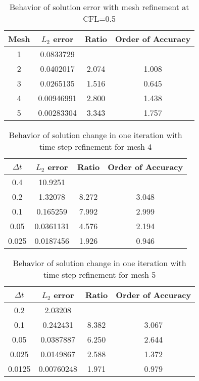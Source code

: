 \documentclass{article}
\begin{document}
\begin{table}[H]
\centering
\caption{Behavior of solution error with mesh refinement at CFL=0.5}
\label{table_order_2}
\vspace{10pt}
\begin{tabular}{cccc}
\hline
Mesh & $L_2$ error & Ratio & Order of Accuracy\\
\hline\hline
1 & 0.0833729  &       &       \\
2 & 0.0402017  & 2.074 & 1.008 \\
3 & 0.0265135  & 1.516 & 0.645 \\
4 & 0.00946991 & 2.800 & 1.438 \\
5 & 0.00283304 & 3.343 & 1.757 \\
\hline
\end{tabular}
\end{table}

\begin{table}[H]
\centering
\caption{Behavior of solution change in one iteration with time step refinement for mesh 4}
\label{table_order_3}
\vspace{10pt}
\begin{tabular}{cccc}
\hline
$\Delta t$ & $L_2$ error & Ratio & Order of Accuracy\\
\hline\hline
0.4   & 10.9251   &       &       \\
0.2   & 1.32078   & 8.272 & 3.048 \\
0.1   & 0.165259  & 7.992 & 2.999 \\
0.05  & 0.0361131 & 4.576 & 2.194 \\
0.025 & 0.0187456 & 1.926 & 0.946 \\
\hline
\end{tabular}
\end{table}

\begin{table}[H]
\centering
\caption{Behavior of solution change in one iteration with time step refinement for mesh 5}
\label{table_order_4}
\vspace{10pt}
\begin{tabular}{cccc}
\hline
$\Delta t$ & $L_2$ error & Ratio & Order of Accuracy\\
\hline\hline
0.2    & 2.03208    &       &       \\
0.1    & 0.242431   & 8.382 & 3.067 \\
0.05   & 0.0387887  & 6.250 & 2.644 \\
0.025  & 0.0149867  & 2.588 & 1.372 \\
0.0125 & 0.00760248 & 1.971 & 0.979 \\
\hline
\end{tabular}
\end{table}
\end{document}
